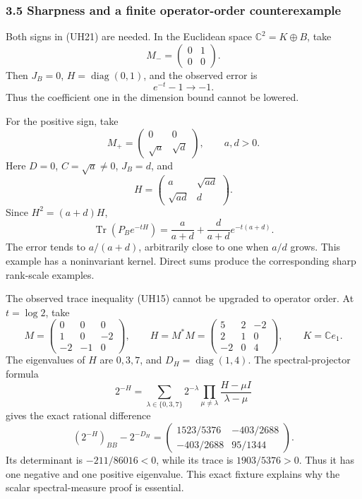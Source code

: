 \documentclass[11pt]{article}
\begin{document}
\subsubsection{3.5 Sharpness and a finite operator-order counterexample}\label{sharpness-and-a-finite-operator-order-counterexample}

Both signs in (UH21) are needed. In the Euclidean space \(\mathbb C^2=K\oplus B\), take \[
 M_-=\begin{pmatrix}0&1\\0&0\end{pmatrix}.
\] Then \(J_B=0\), \(H=\operatorname{diag}(0,1)\), and the observed error is \[
 e^{-t}-1\longrightarrow-1.
\] Thus the coefficient one in the dimension bound cannot be lowered.

For the positive sign, take \[
 M_+=\begin{pmatrix}0&0\\\sqrt a&\sqrt d\end{pmatrix},
 \qquad a,d>0.
\] Here \(D=0\), \(C=\sqrt a\ne0\), \(J_B=d\), and \[
 H=\begin{pmatrix}a&\sqrt{ad}\\\sqrt{ad}&d\end{pmatrix}.
\] Since \(H^2=(a+d)H\), \[
 \operatorname{Tr}(P_Be^{-tH})
 =\frac{a}{a+d}+\frac{d}{a+d}e^{-t(a+d)}.
\] The error tends to \(a/(a+d)\), arbitrarily close to one when \(a/d\) grows. This example has a noninvariant kernel. Direct sums produce the corresponding sharp rank-scale examples.

The observed trace inequality (UH15) cannot be upgraded to operator order. At \(t=\log2\), take \[
 M=\begin{pmatrix}0&0&0\\1&0&-2\\-2&-1&0\end{pmatrix},
 \qquad
 H=M^*M=\begin{pmatrix}5&2&-2\\2&1&0\\-2&0&4\end{pmatrix},
 \qquad K=\mathbb Ce_1.
\] The eigenvalues of \(H\) are \(0,3,7\), and \(D_H=\operatorname{diag}(1,4)\). The spectral-projector formula \[
 2^{-H}=\sum_{\lambda\in\{0,3,7\}}2^{-\lambda}
 \prod_{\mu\ne\lambda}\frac{H-\mu I}{\lambda-\mu}
\] gives the exact rational difference \[
 (2^{-H})_{BB}-2^{-D_H}
 =
 \begin{pmatrix}
 1523/5376&-403/2688\\
 -403/2688&95/1344
 \end{pmatrix}.
 \tag{UH23}
\] Its determinant is \(-211/86016<0\), while its trace is \(1903/5376>0\). Thus it has one negative and one positive eigenvalue. This exact fixture explains why the scalar spectral-measure proof is essential.
\end{document}
